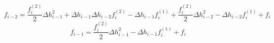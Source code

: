 \begin{equation} 
f_{{i-2}} = \frac{f^{{(2)}}_{i}}{2} \Delta h_{{i-1}}^{2} + \Delta h_{{i-1}} \Delta h_{{i-2}} f^{{(2)}}_{i} - \Delta h_{{i-1}} f^{{(1)}}_{i} + \frac{f^{{(2)}}_{i}}{2} \Delta h_{{i-2}}^{2} - \Delta h_{{i-2}} f^{{(1)}}_{i} + f_{i}
 \end{equation} 
\begin{equation} 
f_{{i-1}} = \frac{f^{{(2)}}_{i}}{2} \Delta h_{{i-1}}^{2} - \Delta h_{{i-1}} f^{{(1)}}_{i} + f_{i}
 \end{equation} 
